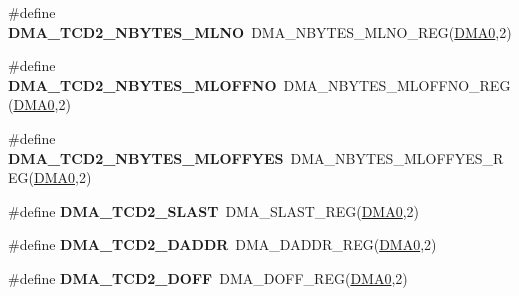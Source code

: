 \begin{DoxyCompactItemize}
\item 
\#define {\bfseries D\+M\+A\+\_\+\+T\+C\+D2\+\_\+\+N\+B\+Y\+T\+E\+S\+\_\+\+M\+L\+NO}~D\+M\+A\+\_\+\+N\+B\+Y\+T\+E\+S\+\_\+\+M\+L\+N\+O\+\_\+\+R\+EG(\hyperlink{group__DMA__Peripheral__Access__Layer_ga4103044f9ca209772f513dc694513ffb}{D\+M\+A0},2)\hypertarget{group__DMA__Register__Accessor__Macros_gaa7eefc1531e30e8f88f39e91f8468244}{}\label{group__DMA__Register__Accessor__Macros_gaa7eefc1531e30e8f88f39e91f8468244}

\item 
\#define {\bfseries D\+M\+A\+\_\+\+T\+C\+D2\+\_\+\+N\+B\+Y\+T\+E\+S\+\_\+\+M\+L\+O\+F\+F\+NO}~D\+M\+A\+\_\+\+N\+B\+Y\+T\+E\+S\+\_\+\+M\+L\+O\+F\+F\+N\+O\+\_\+\+R\+EG(\hyperlink{group__DMA__Peripheral__Access__Layer_ga4103044f9ca209772f513dc694513ffb}{D\+M\+A0},2)\hypertarget{group__DMA__Register__Accessor__Macros_ga9a66b7923ef33c03d078edaf888dbe50}{}\label{group__DMA__Register__Accessor__Macros_ga9a66b7923ef33c03d078edaf888dbe50}

\item 
\#define {\bfseries D\+M\+A\+\_\+\+T\+C\+D2\+\_\+\+N\+B\+Y\+T\+E\+S\+\_\+\+M\+L\+O\+F\+F\+Y\+ES}~D\+M\+A\+\_\+\+N\+B\+Y\+T\+E\+S\+\_\+\+M\+L\+O\+F\+F\+Y\+E\+S\+\_\+\+R\+EG(\hyperlink{group__DMA__Peripheral__Access__Layer_ga4103044f9ca209772f513dc694513ffb}{D\+M\+A0},2)\hypertarget{group__DMA__Register__Accessor__Macros_gae2118daf31ada0b80777846e3a4392d4}{}\label{group__DMA__Register__Accessor__Macros_gae2118daf31ada0b80777846e3a4392d4}

\item 
\#define {\bfseries D\+M\+A\+\_\+\+T\+C\+D2\+\_\+\+S\+L\+A\+ST}~D\+M\+A\+\_\+\+S\+L\+A\+S\+T\+\_\+\+R\+EG(\hyperlink{group__DMA__Peripheral__Access__Layer_ga4103044f9ca209772f513dc694513ffb}{D\+M\+A0},2)\hypertarget{group__DMA__Register__Accessor__Macros_gaa05cc6cdf9d615cc8fdcaae8878e71c2}{}\label{group__DMA__Register__Accessor__Macros_gaa05cc6cdf9d615cc8fdcaae8878e71c2}

\item 
\#define {\bfseries D\+M\+A\+\_\+\+T\+C\+D2\+\_\+\+D\+A\+D\+DR}~D\+M\+A\+\_\+\+D\+A\+D\+D\+R\+\_\+\+R\+EG(\hyperlink{group__DMA__Peripheral__Access__Layer_ga4103044f9ca209772f513dc694513ffb}{D\+M\+A0},2)\hypertarget{group__DMA__Register__Accessor__Macros_ga2c9b29c3d17e214a72000e9c5920978f}{}\label{group__DMA__Register__Accessor__Macros_ga2c9b29c3d17e214a72000e9c5920978f}

\item 
\#define {\bfseries D\+M\+A\+\_\+\+T\+C\+D2\+\_\+\+D\+O\+FF}~D\+M\+A\+\_\+\+D\+O\+F\+F\+\_\+\+R\+EG(\hyperlink{group__DMA__Peripheral__Access__Layer_ga4103044f9ca209772f513dc694513ffb}{D\+M\+A0},2)\hypertarget{group__DMA__Register__Accessor__Macros_ga591bcfc8b6f9965d6ca5ff3ebcb1af5e}{}\label{group__DMA__Register__Accessor__Macros_ga591bcfc8b6f9965d6ca5ff3ebcb1af5e}


\end{DoxyCompactItemize}
